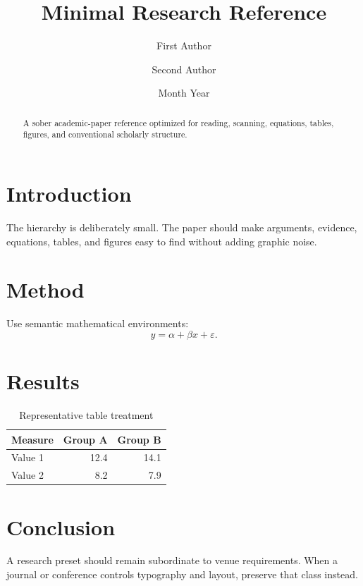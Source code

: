 \documentclass[11pt,a4paper]{article}
\title{\vspace{-1.5em}Minimal Research Reference}
\author{First Author \and Second Author}
\date{Month Year}
\begin{document}
\maketitle

\begin{abstract}
A sober academic-paper reference optimized for reading, scanning, equations, tables,
figures, and conventional scholarly structure.
\end{abstract}

\section{Introduction}
The hierarchy is deliberately small. The paper should make arguments, evidence, equations,
tables, and figures easy to find without adding graphic noise.

\section{Method}
Use semantic mathematical environments:
\begin{equation}
y = \alpha + \beta x + \varepsilon.
\end{equation}

\section{Results}
\begin{table}[ht]
\centering
\caption{Representative table treatment}
\begin{tabular}{lrr}
\toprule
Measure & Group A & Group B \\
\midrule
Value 1 & 12.4 & 14.1 \\
Value 2 &  8.2 &  7.9 \\
\bottomrule
\end{tabular}
\end{table}

\section{Conclusion}
A research preset should remain subordinate to venue requirements. When a journal or
conference controls typography and layout, preserve that class instead.
\end{document}
